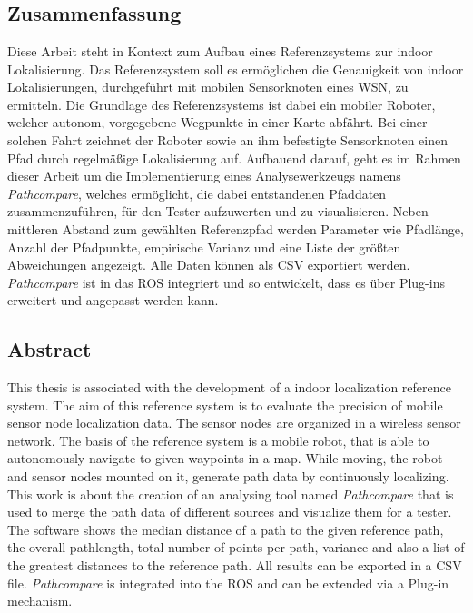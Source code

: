 \chapter*{\abstractname}

\section*{Zusammenfassung}

Diese Arbeit steht in Kontext zum Aufbau eines Referenzsystems zur indoor
Lokalisierung. Das Referenzsystem soll es ermöglichen die Genauigkeit von
indoor Lokalisierungen, durchgeführt mit mobilen Sensorknoten eines \gls{WSN},
zu ermitteln. Die Grundlage des Referenzsystems ist dabei ein mobiler Roboter,
welcher autonom, vorgegebene Wegpunkte in einer Karte abfährt. Bei einer solchen
Fahrt zeichnet der Roboter sowie an ihm befestigte Sensorknoten einen Pfad
durch regelmäßige Lokalisierung auf. Aufbauend darauf, geht es im Rahmen dieser
Arbeit um die Implementierung eines Analysewerkzeugs namens
\textit{Pathcompare}, welches ermöglicht, die dabei entstandenen Pfaddaten
zusammenzuführen, für den Tester aufzuwerten und zu visualisieren. Neben
mittleren Abstand zum gewählten Referenzpfad werden Parameter wie
Pfadlänge, Anzahl der Pfadpunkte, empirische Varianz und eine Liste der größten
Abweichungen angezeigt. Alle Daten können als \gls{CSV} exportiert werden.
\textit{Pathcompare} ist in das \gls{ROS} integriert und so entwickelt, dass es
über Plug-ins erweitert und angepasst werden kann. 



\section*{Abstract} 
This thesis is associated with the development of a indoor
localization reference system. The aim of this reference system is to evaluate
the precision of mobile sensor node localization data. The sensor nodes are
organized in a wireless sensor network. The basis of the reference system is a
mobile robot, that is able to autonomously navigate to given waypoints in a map.
While moving, the robot and sensor nodes mounted on it, generate path data by
continuously localizing. This work is about the creation of an analysing tool
named \textit{Pathcompare} that is used to merge the path data of different
sources and visualize them for a tester. The software shows the median distance
of a path to the given reference path, the overall pathlength, total number of
points per path, variance and also a list of the greatest distances to the
reference path.  All results can be exported in a \gls{CSV} file.
\textit{Pathcompare} is integrated into the \gls{ROS} and can be extended via a
Plug-in mechanism.
